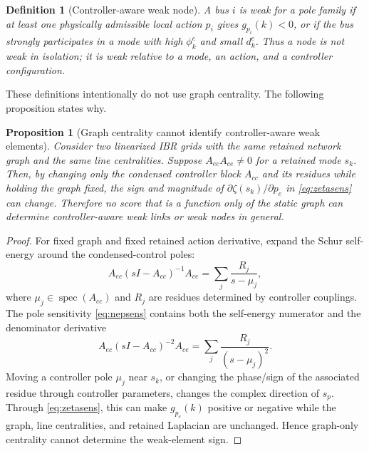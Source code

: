 \documentclass[conference]{IEEEtran}
\newtheorem{proposition}{Proposition}
\newtheorem{definition}{Definition}
\newcommand{\spec}{\operatorname{spec}}
\begin{document}
\begin{definition}[Controller-aware weak node]
A bus $i$ is weak for a pole family if at least one physically admissible local action $p_i$ gives $g_{p_i}(k)<0$, or if the bus strongly participates in a mode with high $\phi_k^c$ and small $d_k^c$. Thus a node is not weak in isolation; it is weak relative to a mode, an action, and a controller configuration.
\end{definition}

These definitions intentionally do not use graph centrality. The following proposition states why.

\begin{proposition}[Graph centrality cannot identify controller-aware weak elements]
Consider two linearized IBR grids with the same retained network graph and the same line centralities. Suppose $A_{ec}A_{ce}\neq0$ for a retained mode $s_k$. Then, by changing only the condensed controller block $A_{cc}$ and its residues while holding the graph fixed, the sign and magnitude of $\partial\zeta(s_k)/\partial p_e$ in \eqref{eq:zetasens} can change. Therefore no score that is a function only of the static graph can determine controller-aware weak links or weak nodes in general.
\end{proposition}

\begin{proof}
For fixed graph and fixed retained action derivative, expand the Schur self-energy around the condensed-control poles:
\begin{equation}
  A_{ec}(sI-A_{cc})^{-1}A_{ce}
  =
  \sum_j \frac{R_j}{s-\mu_j},
  \label{eq:residue}
\end{equation}
where $\mu_j\in\spec(A_{cc})$ and $R_j$ are residues determined by controller couplings. The pole sensitivity \eqref{eq:nepsens} contains both the self-energy numerator and the denominator derivative
\begin{equation}
  A_{ec}(sI-A_{cc})^{-2}A_{ce}
  =
  \sum_j \frac{R_j}{(s-\mu_j)^2}.
  \label{eq:residue2}
\end{equation}
Moving a controller pole $\mu_j$ near $s_k$, or changing the phase/sign of the associated residue through controller parameters, changes the complex direction of $s_p$. Through \eqref{eq:zetasens}, this can make $g_{p_e}(k)$ positive or negative while the graph, line centralities, and retained Laplacian are unchanged. Hence graph-only centrality cannot determine the weak-element sign.
\end{proof}
\end{document}
